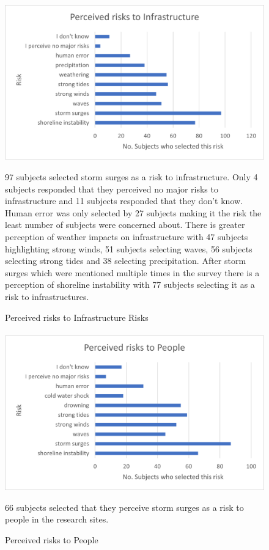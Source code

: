 \begin{figure}[H]
    \centering
    \includegraphics{fig_results/percieved risks to infrastructure.png}
    \caption{Perceived risks to Infrastructure Risks}{ 97 subjects selected storm surges as a risk to infrastructure. Only 4 subjects responded that they perceived no major risks to infrastructure and 11 subjects responded that they don't know. Human error was only selected by 27 subjects making it the risk the least number of subjects were concerned about. There is greater perception of weather impacts on infrastructure with 47 subjects highlighting strong winds, 51 subjects selecting waves, 56 subjects selecting strong tides and 38 selecting precipitation. After storm surges which were mentioned multiple times in the survey there is a perception of shoreline instability with 77 subjects selecting it as a risk to infrastructures.   }
    \label{fig:risk_infrastructure}
\end{figure}
\paragraph{}


\begin{figure}[H]
    \centering
    \includegraphics{fig_results/percieved risks to people.png}
    \caption{Perceived risks to People}{ 66 subjects selected that they perceive storm surges as a risk to people in the research sites. }
    \label{fig:risk_people}
\end{figure}
